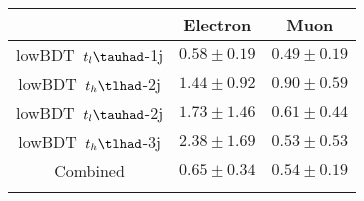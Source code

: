 \centering
\begin{tabular}{ccc} \toprule\toprule
 & Electron & Muon\\\midrule
lowBDT~$t_{l}\tauhad$-1j & $0.58\pm0.19$ & $0.49\pm0.19$\\
lowBDT~$t_{h}\tlhad$-2j & $1.44\pm0.92$ & $0.90\pm0.59$\\
lowBDT~$t_{l}\tauhad$-2j & $1.73\pm1.46$ & $0.61\pm0.44$\\
lowBDT~$t_{h}\tlhad$-3j & $2.38\pm1.69$ & $0.53\pm0.53$\\
Combined & $0.65\pm0.34$ & $0.54\pm0.19$\\
\bottomrule\bottomrule\\
\end{tabular}
